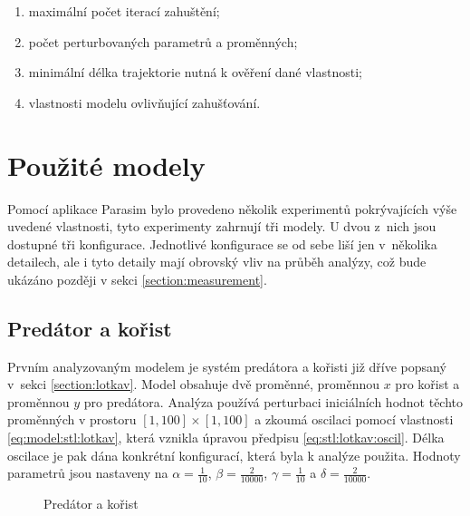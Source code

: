 \begin{enumerate}
	\item	maximální počet iterací zahuštění;
	\item	počet perturbovaných parametrů a proměnných;
	\item	minimální délka trajektorie nutná k ověření dané vlastnosti;
	\item	vlastnosti modelu ovlivňující zahušťování.
\end{enumerate}

\section{Použité modely}

Pomocí aplikace Parasim bylo provedeno několik experimentů po\-krý\-va\-jí\-cích výše uvedené vlastnosti, tyto experimenty
zahrnují tři modely. U dvou z~nich jsou dostupné tři konfigurace. Jednotlivé konfigurace se od sebe liší 
jen v~několika detailech, ale i tyto detaily mají obrovský vliv na průběh analýzy, což bude ukázáno později
v sekci \ref{section:measurement}.

\subsection{Predátor a kořist}

Prvním analyzovaným modelem je systém predátora a kořisti již dříve popsaný v~sek\-ci \ref{section:lotkav}. Model
obsahuje dvě proměnné, proměnnou $x$ pro kořist a pro\-měn\-nou $y$ pro predátora. Analýza používá
perturbaci iniciálních hodnot  těchto proměnných v prostoru $[1, 100] \times [1, 100]$ a zkoumá oscilaci pomocí vlastnosti \ref{eq:model:stl:lotkav},
která vznikla úpravou předpisu \ref{eq:stl:lotkav:oscil}. Délka oscilace je pak dána konkrétní konfigurací,
která byla k analýze použita. Hodnoty parametrů jsou nastaveny na $\alpha = \frac{1}{10}$,  $\beta = \frac{2}{10000}$, $\gamma = \frac{1}{10}$ a $\delta = \frac{2}{10000}$.

\begin{figure}[h!]
\begin{center}
\caption{Predátor a kořist}
\end{center}
\end{figure}

